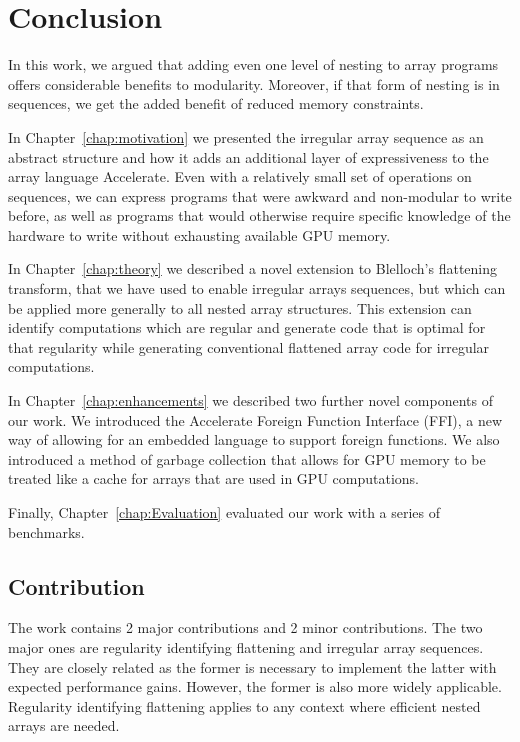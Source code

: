 \chapter{Conclusion}

In this work, we argued that adding even one level of nesting to array programs offers considerable benefits to modularity. Moreover, if that form of nesting is in sequences, we get the added benefit of reduced memory constraints.

In Chapter~\ref{chap:motivation} we presented the irregular array sequence as an abstract structure and how it adds an additional layer of expressiveness to the array language Accelerate. Even with a relatively small set of operations on sequences, we can express programs that were awkward and non-modular to write before, as well as programs that would otherwise require specific knowledge of the hardware to write without exhausting available GPU memory.

In Chapter~\ref{chap:theory} we described a novel extension to Blelloch's flattening transform, that we have used to enable irregular arrays sequences, but which can be applied more generally to all nested array structures. This extension can identify computations which are regular and generate code that is optimal for that regularity while generating conventional flattened array code for irregular computations.

In Chapter~\ref{chap:enhancements} we described two further novel components of our work. We introduced the Accelerate Foreign Function Interface (FFI), a new way of allowing for an embedded language to support foreign functions. We also introduced a method of garbage collection that allows for GPU memory to be treated like a cache for arrays that are used in GPU computations.

Finally, Chapter~\ref{chap:Evaluation} evaluated our work with a series of benchmarks.

\section{Contribution}

The work contains 2 major contributions and 2 minor contributions. The two major ones are regularity identifying flattening and irregular array sequences. They are closely related as the former is necessary to implement the latter with expected performance gains. However, the former is also more widely applicable. Regularity identifying flattening applies to any context where efficient nested arrays are needed.


